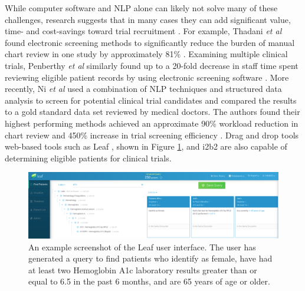 \documentclass[../main.tex]{subfiles}
\begin{document}
While computer software and NLP alone can likely not solve many of these challenges, research suggests that in many cases they can add significant value, time- and cost-savings toward trial recruitment \cite{penberthy2010automated, thadani2009electronic}. For example, Thadani \textit{et al} found electronic screening methods to significantly reduce the burden of manual chart review in one study by approximately 81\% \cite{thadani2009electronic}. Examining multiple clinical trials, Penberthy \textit{et al} similarly found up to a 20-fold decrease in staff time spent reviewing eligible patient records by using electronic screening software \cite{penberthy2010automated}. More recently, Ni \textit{et al} used a combination of NLP techniques and structured data analysis to screen for potential clinical trial candidates and compared the results to a gold standard data set reviewed by medical doctors. The authors found their highest performing methods achieved an approximate 90\% workload reduction in chart review and 450\% increase in trial screening efficiency \cite{ni2015automated}. Drag and drop tools web-based tools such as Leaf \cite{dobbins2019leaf}, shown in Figure \ref{fig_leaf}, and i2b2 \cite{murphy2010serving} are also capable of determining eligible patients for clinical trials.

\begin{figure}[h!]
  \includegraphics[scale=0.28]{Figures/2_background/leaf_full.png}  
\caption{An example screenshot of the Leaf user interface. The user has generated a query to find patients who identify as female, have had at least two Hemoglobin A1c laboratory results greater than or equal to 6.5 in the past 6 months, and are 65 years of age or older.}
\label{fig_leaf}
\end{figure}
\end{document}
